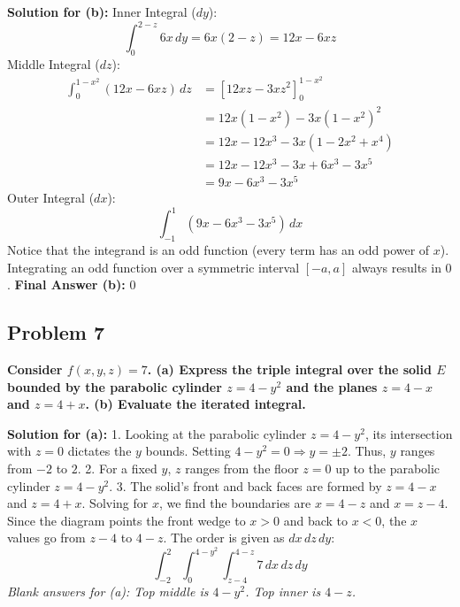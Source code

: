 \documentclass[12pt]{article}
\begin{document}
\textbf{Solution for (b):}
Inner Integral ($dy$):
\[ \int_{0}^{2-z} 6x \, dy = 6x(2-z) = 12x - 6xz \]
Middle Integral ($dz$):
\begin{align*} 
\int_{0}^{1-x^2} (12x - 6xz) \, dz &= \left[ 12xz - 3xz^2 \right]_{0}^{1-x^2} \\
&= 12x(1-x^2) - 3x(1-x^2)^2 \\
&= 12x - 12x^3 - 3x(1 - 2x^2 + x^4) \\
&= 12x - 12x^3 - 3x + 6x^3 - 3x^5 \\
&= 9x - 6x^3 - 3x^5
\end{align*}
Outer Integral ($dx$):
\[ \int_{-1}^{1} (9x - 6x^3 - 3x^5) \, dx \]
Notice that the integrand is an odd function (every term has an odd power of $x$). Integrating an odd function over a symmetric interval $[-a, a]$ always results in $0$.
\textbf{Final Answer (b):} $0$

\vspace{0.5cm}
\subsection*{Problem 7}
\textbf{Consider $f(x, y, z) = 7$. (a) Express the triple integral over the solid $E$ bounded by the parabolic cylinder $z = 4 - y^2$ and the planes $z = 4 - x$ and $z = 4 + x$. (b) Evaluate the iterated integral.}

\textbf{Solution for (a):}
1. Looking at the parabolic cylinder $z = 4 - y^2$, its intersection with $z=0$ dictates the $y$ bounds. Setting $4-y^2 = 0 \Rightarrow y = \pm 2$. Thus, $y$ ranges from $-2$ to $2$.
2. For a fixed $y$, $z$ ranges from the floor $z=0$ up to the parabolic cylinder $z = 4 - y^2$.
3. The solid's front and back faces are formed by $z = 4 - x$ and $z = 4 + x$. Solving for $x$, we find the boundaries are $x = 4-z$ and $x = z-4$. Since the diagram points the front wedge to $x > 0$ and back to $x < 0$, the $x$ values go from $z-4$ to $4-z$.
The order is given as $dx \, dz \, dy$:
\[ \int_{-2}^{2} \int_{0}^{4-y^2} \int_{z-4}^{4-z} 7 \, dx \, dz \, dy \]
\textit{Blank answers for (a): Top middle is $4-y^2$. Top inner is $4-z$.}
\end{document}
